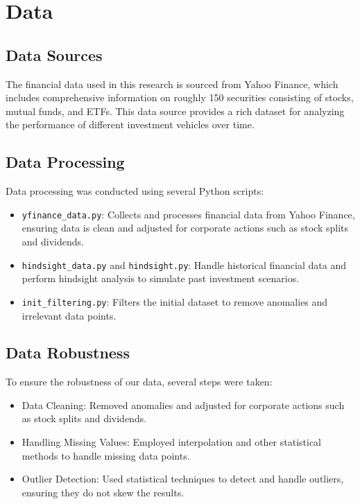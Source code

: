\section{Data}

\subsection{Data Sources}
The financial data used in this research is sourced from Yahoo Finance, which includes comprehensive information on roughly 150 securities consisting of stocks, mutual funds, and ETFs. This data source provides a rich dataset for analyzing the performance of different investment vehicles over time.

\subsection{Data Processing}
Data processing was conducted using several Python scripts:
\begin{itemize}
    \item \texttt{yfinance\_data.py}: Collects and processes financial data from Yahoo Finance, ensuring data is clean and adjusted for corporate actions such as stock splits and dividends.
    \item \texttt{hindsight\_data.py} and \texttt{hindsight.py}: Handle historical financial data and perform hindsight analysis to simulate past investment scenarios.
    \item \texttt{init\_filtering.py}: Filters the initial dataset to remove anomalies and irrelevant data points.
\end{itemize}

\subsection{Data Robustness}
To ensure the robustness of our data, several steps were taken:
\begin{itemize}
    \item Data Cleaning: Removed anomalies and adjusted for corporate actions such as stock splits and dividends.
    \item Handling Missing Values: Employed interpolation and other statistical methods to handle missing data points.
    \item Outlier Detection: Used statistical techniques to detect and handle outliers, ensuring they do not skew the results.
\end{itemize}

